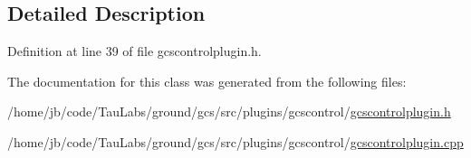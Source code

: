 \subsection{\-Detailed \-Description}


\-Definition at line 39 of file gcscontrolplugin.\-h.



\-The documentation for this class was generated from the following files\-:\begin{DoxyCompactItemize}
\item 
/home/jb/code/\-Tau\-Labs/ground/gcs/src/plugins/gcscontrol/\hyperlink{gcscontrolplugin_8h}{gcscontrolplugin.\-h}\item 
/home/jb/code/\-Tau\-Labs/ground/gcs/src/plugins/gcscontrol/\hyperlink{gcscontrolplugin_8cpp}{gcscontrolplugin.\-cpp}\end{DoxyCompactItemize}
